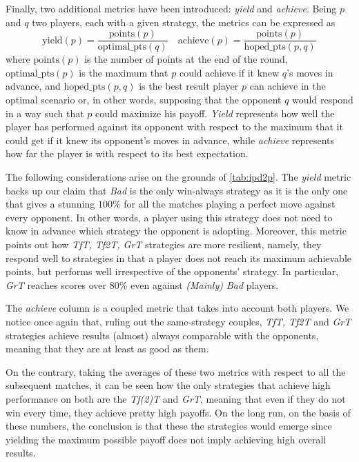 \documentclass[journal,10pt,twoside]{IEEEtran}
\begin{document}
Finally, two additional metrics have been introduced: \textit{yield} and \textit{achieve}. 
Being $p$ and $q$ two players, each with a given strategy, the metrics can be expressed as
$$
\mathrm{yield}(p) = \frac{\mathrm{points}(p)}{\mathrm{optimal\_pts}(q)} \quad
\mathrm{achieve}(p) = \frac{\mathrm{points}(p)}{\mathrm{hoped\_pts}(p,q)}
$$
where $\mathrm{points}(p)$ is the number of points at the end of the round,
$\mathrm{optimal\_pts}(p)$ is the maximum that $p$ could achieve if it knew $q$'s moves in advance, and
$\mathrm{hoped\_pts}(p,q)$ is the best result player $p$ can achieve in the optimal scenario or, in other words, supposing that the opponent $q$ would respond in a way such that $p$ could maximize his payoff.
\textit{Yield} represents how well the player has performed against its opponent with respect to the maximum that it could get if it knew its opponent's moves in advance, while \textit{achieve} represents how far the player is with respect to its best expectation.

The following considerations arise on the grounds of \autoref{tab:ipd2p}.
The \textit{yield} metric backs up our claim that \textit{Bad} is the only win-always strategy as it is the only one that gives a stunning $100\%$ for all the matches playing a perfect move against every opponent. In other words, a player using this strategy does not need to know in advance which strategy the opponent is adopting. Moreover, this metric points out how \textit{TfT, Tf2T, GrT} strategies are more resilient, namely, they respond well to strategies in that a player does not reach its maximum achievable points, but performs well irrespective of the opponents' strategy. In particular, \textit{GrT} reaches scores over $80\%$ even against \textit{(Mainly) Bad} players.

The \textit{achieve} column is a coupled metric that takes into account both players. We notice once again that, ruling out the same-strategy couples, \textit{TfT, Tf2T} and \textit{GrT} strategies achieve results (almost) always comparable with the opponents, meaning that they are at least as good as them.

On the contrary, taking the averages of these two metrics with respect to all the subsequent matches, it can be seen how the only strategies that achieve high performance on both are the \textit{Tf(2)T} and \textit{GrT}, meaning that even if they do not win every time, they achieve pretty high payoffs. %
On the long run, on the basis of these numbers, the conclusion is that these the strategies would emerge since yielding the maximum possible payoff does not imply achieving high overall results.
\end{document}
